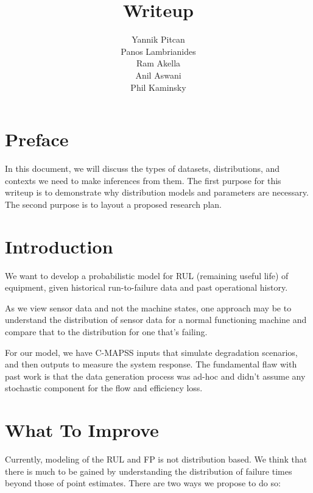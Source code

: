 \documentclass[english]{article}
\numberwithin{equation}{section}
\begin{document}
	
	\title{Writeup}
	
	\author{Yannik Pitcan \\
		Panos Lambrianides \\
		Ram Akella \\
		Anil Aswani \\
		Phil Kaminsky
	}
	\maketitle

\section*{Preface}
In this document, we will discuss the types of datasets, distributions, and contexts we need to make inferences from them. The first purpose for this writeup is to demonstrate why distribution models and parameters are necessary. The second purpose is to layout a proposed research plan.

\section*{Introduction}
We want to develop a probabilistic model for RUL (remaining useful life) of equipment, given historical run-to-failure data and past operational history.

As we view sensor data and not the machine states, one approach may be to understand the distribution of sensor data for a normal functioning machine and compare that to the distribution for one that's failing.

For our model, we have C-MAPSS inputs that simulate degradation scenarios, and then outputs to measure the system response. The fundamental flaw with past work is that the data generation process was ad-hoc and didn't assume any stochastic component for the flow and efficiency loss.

\section*{What To Improve}
Currently, modeling of the RUL and FP is not distribution based. We think that there is much to be gained by understanding the distribution of failure times beyond those of point estimates. There are two ways we propose to do so:
\end{document}
